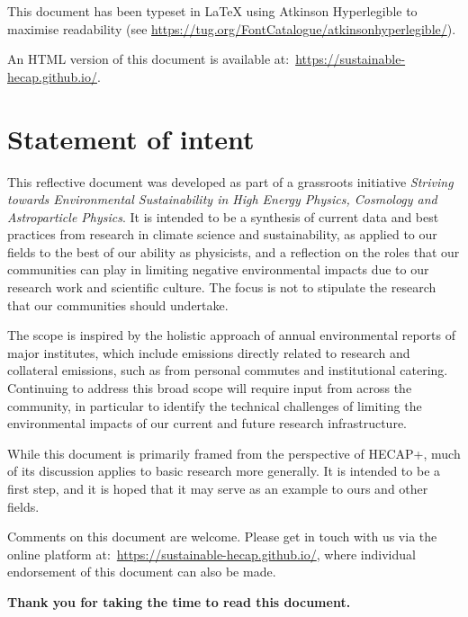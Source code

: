\documentclass[../SustainableHEP.tex]{subfiles}
\begin{document}
\noindent This document has been typeset in LaTeX using Atkinson Hyperlegible to maximise readability (see \url{https://tug.org/FontCatalogue/atkinsonhyperlegible/}).

\noindent An HTML version of this document is available at:~\url{https://sustainable-hecap.github.io/}.

\newpage

\thispagestyle{empty}

\section*{Statement of intent}
    
        This reflective document was developed as part of a grassroots initiative {\it Striving towards Environmental Sustainability in High Energy Physics, Cosmology and Astroparticle Physics}.
        It is intended to be a synthesis of current data and best practices from research in climate science and sustainability, as applied to our fields to the best of our ability as physicists, and a reflection on the roles that our communities can play in limiting negative environmental impacts due to our research work and scientific culture. The focus is not to stipulate the research that our communities should undertake.
        
        The scope is inspired by the holistic approach of annual environmental reports of major institutes, which include emissions directly related to research and collateral emissions, such as from personal commutes and institutional catering.
        Continuing to address this broad scope will require input from across the community, in particular to identify the technical challenges of limiting the environmental impacts of our current and future research infrastructure.

        While this document is primarily framed from the perspective of HECAP+, much of its discussion applies to basic research more generally. It is intended to be a first step, and it is hoped that it may serve as an example to ours and other fields.
        
        Comments on this document are welcome. Please get in touch with us via the online platform at:~\url{https://sustainable-hecap.github.io/}, where individual endorsement of this document can also be made.
        
        \noindent \textbf{Thank you for taking the time to read this document.}
        
\end{document}
